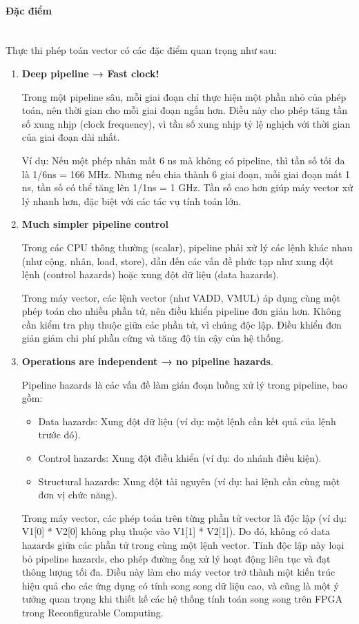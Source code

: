 \documentclass[a4paper]{article}
\begin{document}
\paragraph{Đặc điểm}\leavevmode\\
Thực thi phép toán vector có các đặc điểm quan trọng như sau:
\begin{enumerate}
    \item \textbf{Deep pipeline → Fast clock!}\par Trong một pipeline sâu, mỗi giai đoạn chỉ thực hiện một phần nhỏ của phép toán, nên thời gian cho mỗi giai đoạn ngắn hơn. Điều này cho phép tăng tần số xung nhịp (clock frequency), vì tần số xung nhịp tỷ lệ nghịch với thời gian của giai đoạn dài nhất.\par
    Ví dụ: Nếu một phép nhân mất 6 ns mà không có pipeline, thì tần số tối đa là 1/6ns = 166 MHz. Nhưng nếu chia thành 6 giai đoạn, mỗi giai đoạn mất 1 ns, tần số có thể tăng lên 1/1ns = 1 GHz.	Tần số cao hơn giúp máy vector xử lý nhanh hơn, đặc biệt với các tác vụ tính toán lớn.

    \item \textbf{Much simpler pipeline control}	\par Trong các CPU thông thường (scalar), pipeline phải xử lý các lệnh khác nhau (như cộng, nhân, load, store), dẫn đến các vấn đề phức tạp như xung đột lệnh (control hazards) hoặc xung đột dữ liệu (data hazards). \par
    Trong máy vector, các lệnh vector (như VADD, VMUL) áp dụng cùng một phép toán cho nhiều phần tử, nên điều khiển pipeline đơn giản hơn. Không cần kiểm tra phụ thuộc giữa các phần tử, vì chúng độc lập.	Điều khiển đơn giản giảm chi phí phần cứng và tăng độ tin cậy của hệ thống.

    \item \textbf{Operations are independent → no pipeline hazards}. \par Pipeline hazards là các vấn đề làm gián đoạn luồng xử lý trong pipeline, bao gồm:
    \begin{itemize}
        \item Data hazards: Xung đột dữ liệu (ví dụ: một lệnh cần kết quả của lệnh trước đó).
        \item Control hazards: Xung đột điều khiển (ví dụ: do nhánh điều kiện).
        \item Structural hazards: Xung đột tài nguyên (ví dụ: hai lệnh cần cùng một đơn vị chức năng).
    \end{itemize}
    Trong máy vector, các phép toán trên từng phần tử vector là độc lập (ví dụ: V1[0] * V2[0] không phụ thuộc vào V1[1] * V2[1]). Do đó, không có data hazards giữa các phần tử trong cùng một lệnh vector. Tính độc lập này loại bỏ pipeline hazards, cho phép đường ống xử lý hoạt động liên tục và đạt thông lượng tối đa. Điều này làm cho máy vector trở thành một kiến trúc hiệu quả cho các ứng dụng có tính song song dữ liệu cao, và cũng là một ý tưởng quan trọng khi thiết kế các hệ thống tính toán song song trên FPGA trong Reconfigurable Computing.


\end{enumerate}
\end{document}

